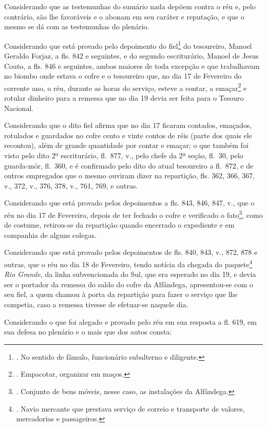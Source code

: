Considerando que as testemunhas do sumário nada depõem contra o réu e,
pelo contrário, são lhe favoráveis e o abonam em seu caráter e
reputação, e que o mesmo se dá com as testemunhas do plenário.

Considerando que está provado pelo depoimento do fiel\footnote{. No
  sentido de fâmulo, funcionário subalterno e diligente.} do tesoureiro,
Manoel Geraldo Forjaz, a fls. 842 e seguintes, e do segundo
escriturário, Manoel de Jesus Couto, a fls. 846 e seguintes, ambos
maiores de toda excepção e que trabalhavam no biombo onde estava o cofre
e o tesoureiro que, no dia 17 de Fevereiro do corrente ano, o réu,
durante as horas do serviço, esteve a contar, a emaçar\footnote{.
  Empacotar, organizar em maços.} e rotular dinheiro para a remessa que
no dia 19 devia ser feita para o Tesouro Nacional.

Considerando que o dito fiel afirma que no dia 17 ficaram contados,
emaçados, rotulados e guardados no cofre cento e vinte contos de réis
(parte dos quais ele recontou), além de grande quantidade por contar e
emaçar; o que também foi visto pelo dito 2º escriturário, fl.~877, v.,
pelo chefe da 2ª seção, fl.~30, pelo guarda-mór, fl.~360, e é confirmado
pelo dito do atual tesoureiro a fl.~872, e de outros empregados que o
mesmo ouviram dizer na repartição, fls. 362, 366, 367, v., 372, v., 376,
378, v., 761, 769, e outras.

Considerando que está provado pelos depoimentos a fls. 843, 846, 847,
v., que o réu no dia 17 de Fevereiro, depois de ter fechado o cofre e
verificado o fato\footnote{. Conjunto de bens móveis, nesse caso, as
  instalações da Alfândega.}, como de costume, retirou-se da repartição
quando encerrado o expediente e em companhia de alguns colegas.

Considerando que está provado pelos depoimentos de fls. 840, 843, v.,
872, 878 e outras, que o réu no dia 18 de Fevereiro, tendo notícia da
chegada do paquete\footnote{. Navio mercante que prestava serviço de
  correio e transporte de valores, mercadorias e passageiros.} \emph{Rio
Grande}, da linha subvencionada do Sul, que era esperado no dia 19, e
devia ser o portador da remessa do saldo do cofre da Alfândega,
apresentou-se com o seu fiel, a quem chamou à porta da repartição para
fazer o serviço que lhe competia, caso a remessa tivesse de efetuar-se
naquele dia.

Considerando o que foi alegado e provado pelo réu em sua resposta a fl.
619, em sua defesa no plenário e o mais que dos autos consta:


